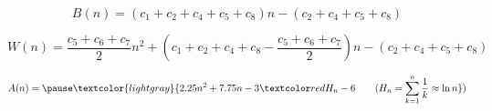 \begin{frame}{}

  \pause
  \[
    B(n) = (c_1 + c_2 + c_4 + c_5 + c_8) n - (c_2 + c_4 + c_5 + c_8)
  \]

  \pause
  \[
    W(n) = \frac{c_5 + c_6 + c_7}{2} n^2 
        + (c_1 + c_2 + c_4 + c_8 - \frac{c_5 + c_6 + c_7}{2}) n
        - (c_2 + c_4 + c_5 + c_8)
  \]

  \pause
  \[
    A(n) = \pause \textcolor{lightgray}{2.25 n^2 + 7.75 n - 3 \red{H_n} - 6 \qquad (H_n = \sum_{k=1}^{n} \frac{1}{k}\approx \ln n})
  \]
\end{frame}
